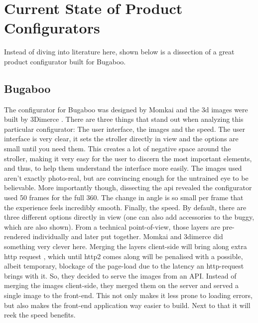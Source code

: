 \section{Current State of Product Configurators}

Instead of diving into literature here, shown below is a dissection of a great product configurator built for Bugaboo.

\subsection{Bugaboo}
The configurator for Bugaboo \cite{Bugaboo} was designed by Momkai and the 3d images were built by 3Dimerce \cite{iRayBlog}. There are three things that stand out when analyzing this particular configurator: The user interface, the images and the speed.
The user interface is very clear, it sets the stroller directly in view and the options are small until you need them. This creates a lot of negative space around the stroller, making it very easy for the user to discern the most important elements, and thus, to help them understand the interface more easily.
The images used aren't exactly photo-real, but are convincing enough for the untrained eye to be believable. More importantly though, dissecting the api revealed the configurator used 50 frames for the full 360. The change in angle is so small per frame that the experience feels incredibly smooth.
Finally, the speed. By default, there are three different options directly in view (one can also add accessories to the buggy, which are also shown). From a technical point-of-view, those layers are pre-rendered individually and later put together. Momkai and 3dimerce \cite{iRayBlog} did something very clever here. Merging the layers client-side will bring along extra http request \cite{latency}, which until http2 comes along will be penalised with a possible, albeit temporary, blockage of the page-load due to the latency an http-request brings with it. So, they decided to serve the images from an API. Instead of merging the images client-side, they merged them on the server and served a single image to the front-end. This not only makes it less prone to loading errors, but also makes the front-end application way easier to build. Next to that it will reek the speed benefits.

